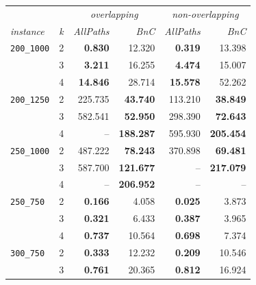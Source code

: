 \documentclass[conference]{IEEEtran}
\begin{document}
\begin{table}
\centering
\captionsetup{font=small}
\label{table:runtime}

\begin{tabular}{|ll|rr|rr|}
\hline
		 &   &  \multicolumn{2}{|c|}{\emph{overlapping}} & \multicolumn{2}{|c|}{\emph{non-overlapping}} \\
         \cline{3-6}
\emph{instance} & \emph{k} &  \emph{AllPaths} &  \emph{BnC} &  \emph{AllPaths} &  \emph{BnC} \\
\hline      
\texttt{200\_1000} & 2 &       \textbf{0.830} &    12.320 &      \textbf{0.319} &    13.398 \\
         & 3 &       \textbf{3.211} &    16.255 &       \textbf{4.474} &    15.007 \\
         & 4 &      \textbf{14.846} &    28.714 &      \textbf{15.578} &    52.262 \\
\hline         
\texttt{200\_1250} & 2 &     225.735 &    \textbf{43.740} &     113.210 &    \textbf{38.849} \\
         & 3 &     582.541 &    \textbf{52.950} &     298.390 &    \textbf{72.643} \\
         & 4 &         -- &   \textbf{188.287} &     595.930 &   \textbf{205.454} \\
\hline         
\texttt{250\_1000} & 2 &     487.222 &    \textbf{78.243} &     370.898 &    \textbf{69.481} \\
         & 3 &     587.700 &   \textbf{121.677} &         -- &   \textbf{217.079} \\
         & 4 &         -- &   \textbf{206.952} &         -- &       -- \\
\hline         
\texttt{250\_750} & 2 &       \textbf{0.166} &     4.058 &       \textbf{0.025} &     3.873 \\
         & 3 &       \textbf{0.321} &     6.433 &       \textbf{0.387} &     3.965 \\
         & 4 &       \textbf{0.737} &    10.564 &       \textbf{0.698} &     7.374 \\
\hline         
\texttt{300\_750} & 2 &       \textbf{0.333} &    12.232 &       \textbf{0.209} &    10.546 \\
         & 3 &       \textbf{0.761} &    20.365 &       \textbf{0.812} &    16.924 \\

\end{tabular}
\end{table}
\end{document}
